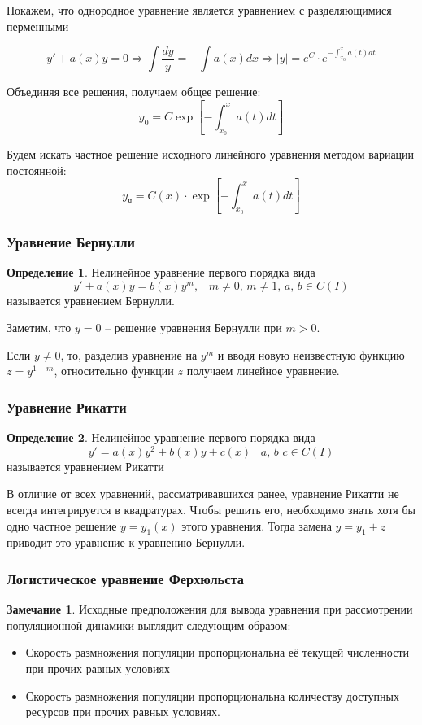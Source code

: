 \documentclass[a4paper,12pt]{article}
\theoremstyle{plain}
\theoremstyle{definition}
\newtheorem{definition}{Определение}[section]
\newtheorem*{note}{Замечание}
\theoremstyle{remark}
\begin{document}
Покажем, что однородное уравнение является уравнением с разделяющимися перменными

\[y' + a(x)y = 0 \Rightarrow \int \frac{dy}{y} = -\int a(x) dx \Rightarrow |y| = e^C \cdot e^{-\int_{x_0}^x a(t) dt}\]

Объединяя все решения, получаем общее решение:
\[y_0 = C \exp\left[-\int_{x_0}^x a(t) dt\right]\]

Будем искать частное решение исходного линейного уравнения методом вариации постоянной:
\[y_{\textbf{ч}} = C(x) \cdot \exp\left[-\int_{x_0}^x a(t) dt\right]\]

\subsubsection*{Уравнение Бернулли}
\begin{definition}
	Нелинейное уравнение первого порядка вида
	\[y' + a(x)y = b(x)y^m,\;\;\; m \neq 0,\, m \neq 1,\, a,\,b \in C(I)\]
	называется уравнением Бернулли.
\end{definition}

Заметим, что $y = 0$ -- решение уравнения Бернулли при $m > 0$.

Если $y \neq 0$, то, разделив уравнение на $y^m$ и вводя новую неизвестную функцию $z = y^{1 - m}$, относительно функции $z$ получаем линейное уравнение.

\subsubsection*{Уравнение Рикатти}
\begin{definition}
	Нелинейное уравнение первого порядка вида
	\[y' = a(x)y^2 + b(x)y + c(x) \;\;\; a,\,b\,\,c \in C(I)\]
	называется уравнением Рикатти
\end{definition}

В отличие от всех уравнений, рассматривавшихся ранее, уравнение Рикатти не всегда интегрируется в квадратурах. Чтобы решить его, необходимо знать хотя бы одно частное решение $y = y_1(x)$ этого уравнения. Тогда замена $y = y_1 + z$ приводит это уравнение к уравнению Бернулли.

\subsubsection*{Логистическое уравнение Ферхюльста}
\begin{note}
	Исходные предположения для вывода уравнения при рассмотрении популяционной динамики выглядит следующим образом:
	\begin{itemize}
		\item Скорость размножения популяции пропорциональна её текущей численности при прочих равных условиях
		\item Скорость размножения популяции пропорциональна количеству доступных ресурсов при прочих равных условиях.
	\end{itemize}
\end{note}
\end{document}

